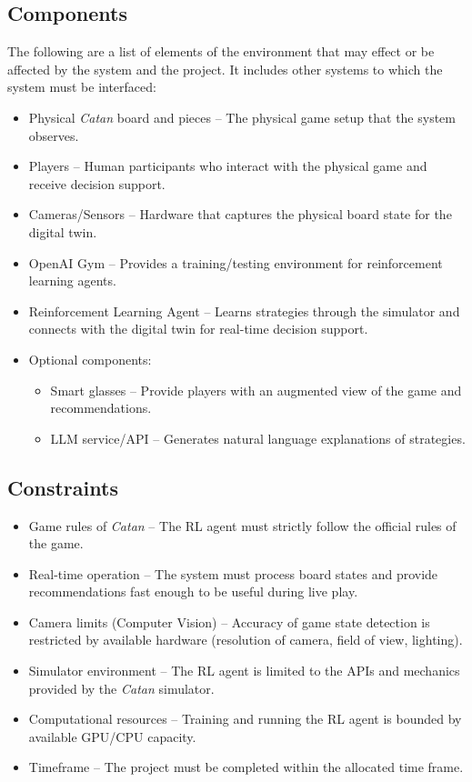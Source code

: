 \documentclass{article}
\begin{document}
\subsection{Components}\label{subsec:components2}
\raggedright The following are a list of elements of the environment that may effect or be affected by the system and the project. It includes other systems to which the system must be interfaced:
\begin{itemize}
    \item {Physical \emph{Catan} board and pieces} – The physical game setup that the system observes.
    \item {Players} – Human participants who interact with the physical game and receive decision support.
    \item {Cameras/Sensors} – Hardware that captures the physical board state for the digital twin.
    \item {OpenAI Gym} – Provides a training/testing environment for reinforcement learning agents.
    \item {Reinforcement Learning Agent} – Learns strategies through the simulator and connects with the digital twin for real-time decision support.
    \item {Optional components:}
    \begin{itemize}
        \item {Smart glasses} – Provide players with an augmented view of the game and recommendations.
        \item {LLM service/API} – Generates natural language explanations of strategies.
    \end{itemize}
\end{itemize}

\subsection{Constraints}\label{subsec:constraints}
\begin{itemize}
    \item {Game rules of \emph{Catan}} – The RL agent must strictly follow the official rules of the game.
    \item {Real-time operation} – The system must process board states and provide recommendations fast enough to be useful during live play.
    \item {Camera limits (Computer Vision)} – Accuracy of game state detection is restricted by available hardware (resolution of camera, field of view, lighting).
    \item {Simulator environment} – The RL agent is limited to the APIs and mechanics provided by the \emph{Catan} simulator.
    \item {Computational resources} – Training and running the RL agent is bounded by available GPU/CPU capacity.
    \item {Timeframe} – The project must be completed within the allocated time frame.
\end{itemize}
\end{document}
